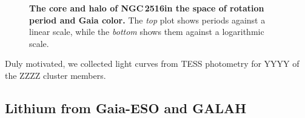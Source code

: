 \documentclass[12pt,twocolumn,tighten]{aastex63}
\newcommand{\cn}{NGC\,2516} %
\begin{document}
\begin{figure}[t]
	\begin{center}
		\leavevmode
	
	\end{center}
	\vspace{-0.7cm}
	\caption{ {\bf The core and halo of \cn in the space of rotation
    period and Gaia color.}
    The {\it top} plot shows periods against a linear scale, while the
    {\it bottom}  shows them against a logarithmic scale.
		\label{fig:rot}
	}
\end{figure}

Duly motivated, we collected light curves from TESS photometry
for YYYY of the ZZZZ cluster members.

\subsection{Lithium from Gaia-ESO and GALAH}
\label{subsec:spectra}
\end{document}
